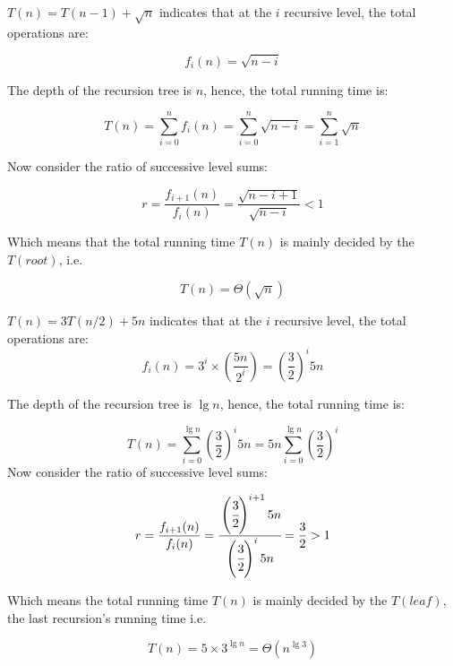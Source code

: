 \begin{homeworkProblem}
\begin{homeworkSubProblem}[$T(n)=T(n-1)+\sqrt{n}$]
$T(n) = T(n-1) + \sqrt{n}$ indicates that at the $i$ recursive level, the total operations are:

\begin{equation}
f_i(n) = \sqrt{n-i}
\end{equation}

The depth of the recursion tree is $n$, hence, the total running time is:

\[T(n) =\sum_{i=0}^n f_i(n) = \sum_{i=0}^n \sqrt{n-i} = \sum_{i=1}^n \sqrt n\]

Now consider the ratio of successive level sums:

\begin{equation}
r = \frac{f_{i+1}(n)}{f_i(n)}
  = \frac{\sqrt{n-i+1}}{\sqrt{n-i}}
  < 1
\end{equation}

Which means that the total running time $T(n)$ is mainly decided by the $T(root)$, i.e.

\begin{equation} \label{eq:6.4}
T(n) = \Theta(\sqrt n)
\end{equation}

\end{homeworkSubProblem}

\begin{homeworkSubProblem}[$T(n)=3T(n/2)+5n$]
$T(n)=3T(n/2)+5n$ indicates that at the $i$ recursive level, the total
operations are:
\begin{equation}
f_i(n) = 3^i\times\left(\frac{5n}{2^i}\right)
       = \left(\frac{3}{2}\right)^i 5n
\end{equation}

The depth of the recursion tree is $\lg n$, hence, the total running time is:

\begin{equation}
T(n) =\sum_{i=0}^{\lg n}\left(\frac{3}{2}\right)^i 5n
     =5n\sum_{i=0}^{\lg n}\left(\frac{3}{2}\right)^i
\end{equation}
Now consider the ratio of successive level sums:

\begin{equation}
r = \frac{f_{i+1}(n)}{f_i(n)}
  = \cfrac{\left(\cfrac{3}{2}\right)^{i+1} 5n}{\left(\cfrac{3}{2}\right)^i 5n}
  = \frac{3}{2}
  > 1
\end{equation}

Which means the total running time $T(n)$ is mainly decided by the $T(leaf)$, the last recursion's running time i.e.

\begin{equation}
T(n) = 5 \times 3^{\lg n}= \Theta(n^{\lg3})
\end{equation}


\end{homeworkSubProblem}
\end{homeworkProblem}

